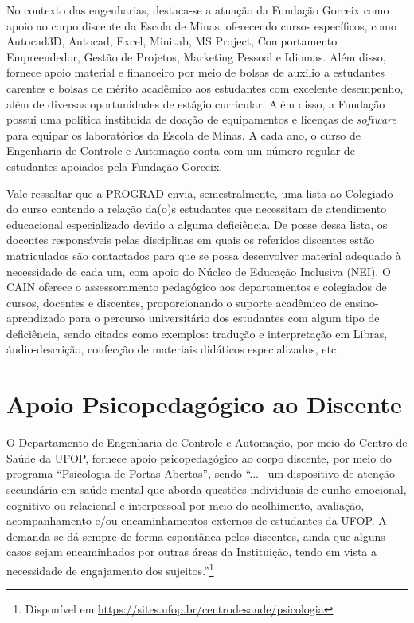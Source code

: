 \documentclass[
	12pt,				%
	openright,			%
	oneside,			%
	a4paper,			%
	english,			%
	brazil				%
	]{abntex2}
\begin{document}
No contexto das engenharias, destaca-se a atuação da Fundação Gorceix como apoio ao corpo discente da Escola de Minas, oferecendo cursos específicos, como Autocad3D, Autocad, Excel, Minitab, MS Project, Comportamento Empreendedor, Gestão de Projetos, Marketing Pessoal e Idiomas. Além disso, fornece apoio material e financeiro por meio de bolsas de auxílio a estudantes carentes e bolsas de mérito acadêmico aos estudantes com excelente desempenho, além de diversas oportunidades de estágio curricular. Além disso, a Fundação possui uma política instituída de doação de equipamentos e licenças de \textit{software} para equipar os laboratórios da Escola de Minas. A cada ano, o curso de Engenharia de Controle e Automação conta com um número regular de estudantes apoiados pela Fundação Gorceix.

Vale ressaltar que a PROGRAD envia, semestralmente, uma lista ao Colegiado do curso contendo a relação da(o)s estudantes que necessitam de atendimento educacional especializado devido a alguma deficiência. De posse dessa lista, os docentes responsáveis pelas disciplinas em quais os referidos discentes estão matriculados são contactados para que se possa desenvolver material adequado à necessidade de cada um, com apoio do Núcleo de Educação Inclusiva (NEI). O CAIN oferece o assessoramento pedagógico aos departamentos e colegiados de cursos, docentes e discentes, proporcionando o suporte acadêmico de ensino-aprendizado para o percurso universitário dos estudantes com algum tipo de deficiência, sendo citados como exemplos: tradução e interpretação em Libras, áudio-descrição, confecção de materiais didáticos especializados, etc.


\section{Apoio Psicopedagógico ao Discente}
O Departamento de Engenharia de Controle e Automação, por meio do Centro de Saúde da UFOP, fornece apoio psicopedagógico ao corpo discente, por meio do programa ``Psicologia de Portas Abertas'', sendo ``...~ um dispositivo de atenção secundária em saúde mental que aborda questões individuais de cunho emocional, cognitivo ou relacional e interpessoal por meio do acolhimento, avaliação, acompanhamento e/ou encaminhamentos externos de estudantes da UFOP. A demanda se dá sempre de forma espontânea pelos discentes, ainda que alguns casos sejam encaminhados por outras áreas da Instituição, tendo em vista a necessidade de engajamento dos sujeitos.''\footnote{
Disponível em \url{https://sites.ufop.br/centrodesaude/psicologia}}
\end{document}
